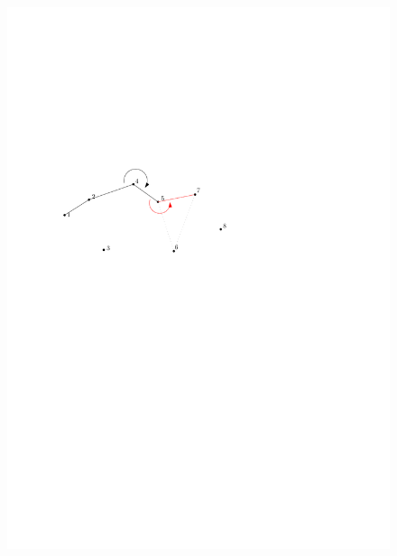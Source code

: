 \begin{frame}
{\begin{figure}[htbp]
\begin{center}
  			\includegraphics[width=.8\linewidth]{bilder/graham7}
			\end{center}
		\end{figure}
	}
\end{frame}
